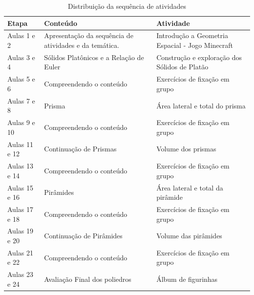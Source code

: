 \begin{table}[htbp] \centering
    \caption{Distribuição da sequência de atividades} \label{tab:Elaboração de sequência de atividades}
    \begin{tabularx}{\textwidth}{|p{3cm}|X|X|}
        \hline
        \textbf{Etapa} & \textbf{Conteúdo}                                      & \textbf{Atividade}                               \\ \hline
        Aulas 1 e 2    & Apresentação da sequência de atividades e da temática. & Introdução a Geometria Espacial - Jogo Minecraft \\ \hline
        Aulas 3 e 4    & Sólidos Platônicos e a Relação de Euler                & Construção e exploração dos Sólidos de Platão    \\ \hline
        Aulas 5 e 6    & Compreendendo o conteúdo                               & Exercícios de fixação em grupo                   \\ \hline
        Aulas 7 e 8    & Prisma                                                 & Área lateral e total do prisma                   \\ \hline
        Aulas 9 e 10   & Compreendendo o conteúdo                               & Exercícios de fixação em grupo                   \\ \hline
        Aulas 11 e 12  & Continuação de Prismas                                 & Volume dos prismas                               \\ \hline
        Aulas 13 e 14  & Compreendendo o conteúdo                               & Exercícios de fixação em grupo                   \\ \hline
        Aulas 15 e 16  & Pirâmides                                              & Área lateral e total da pirâmide                 \\ \hline
        Aulas 17 e 18  & Compreendendo o conteúdo                               & Exercícios de fixação em grupo                   \\ \hline
        Aulas 19 e 20  & Continuação de Pirâmides                               & Volume das pirâmides                             \\ \hline
        Aulas 21 e 22  & Compreendendo o conteúdo                               & Exercícios de fixação em grupo                   \\ \hline
        Aulas 23 e 24  & Avaliação Final dos poliedros                          & Álbum de figurinhas                              \\ \hline
    \end{tabularx}
    \legend{\legendaTabela}
\end{table}

